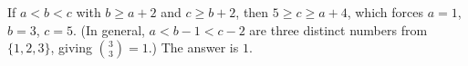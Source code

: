 If $a<b<c$ with $b\ge a+2$ and $c\ge b+2$, then $5\ge c\ge a+4$, which forces $a=1$, $b=3$, $c=5$. (In general, $a<b-1<c-2$ are three distinct numbers from $\{1,2,3\}$, giving $\binom33=1$.) The answer is $\boxed{1}$.

